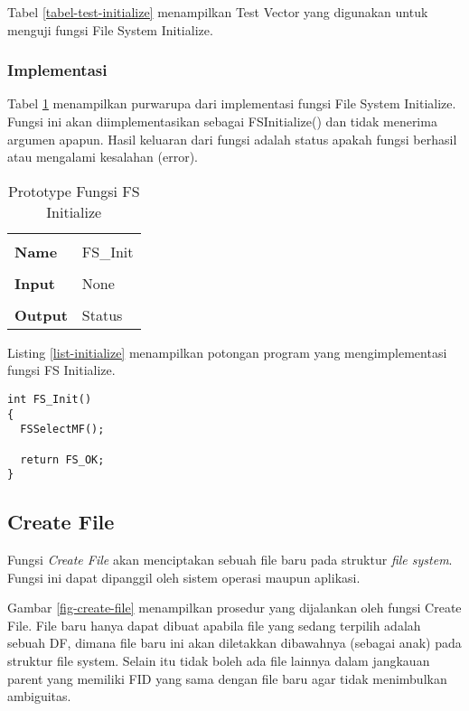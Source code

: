 Tabel \ref{tabel-test-initialize} menampilkan Test Vector yang digunakan untuk menguji fungsi File System Initialize.

\subsubsection{Implementasi}

Tabel \ref{tabel-initialize} menampilkan purwarupa dari implementasi fungsi File System Initialize. Fungsi ini akan diimplementasikan sebagai FSInitialize() dan tidak menerima argumen apapun. Hasil keluaran dari fungsi adalah status apakah fungsi berhasil atau mengalami kesalahan (error).

\begin{table}[htbp]
  \centering
  \begin{tabular}{p{2cm}p{8cm}}
    \hline\\
    {\bf Name} & FS\_Init\\
    \hline\\
    {\bf Input}  & None\\
    \hline\\
    {\bf Output} & Status
    \\
    \hline
  \end{tabular}
  \caption{Prototype Fungsi FS Initialize}
  \label{tabel-initialize}
\end{table}

Listing \ref{list-initialize} menampilkan potongan program yang mengimplementasi fungsi FS Initialize.

\begin{lstlisting}[caption={Listing Program Fungsi FS Initialize}, label={list-initialize}]
int FS_Init()
{
  FSSelectMF();

  return FS_OK;
}
\end{lstlisting}

\subsection{Create File}

Fungsi {\em Create File} akan menciptakan sebuah file baru pada struktur {\em file system}. Fungsi ini dapat dipanggil oleh sistem operasi maupun aplikasi. 

Gambar \ref{fig-create-file} menampilkan prosedur yang dijalankan oleh fungsi Create File. File baru hanya dapat dibuat apabila file yang sedang terpilih adalah sebuah DF, dimana file baru ini akan diletakkan dibawahnya (sebagai anak) pada struktur file system. Selain itu tidak boleh ada file lainnya dalam jangkauan parent yang memiliki FID yang sama dengan file baru agar tidak menimbulkan ambiguitas.

